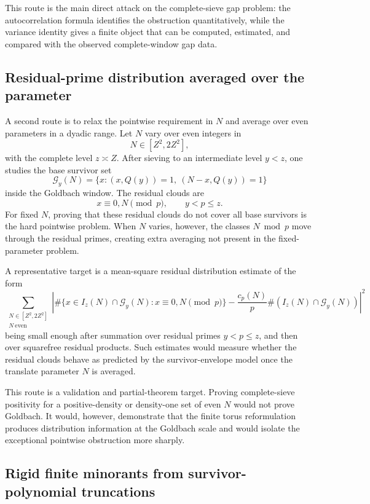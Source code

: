 \documentclass[11pt]{article}
\theoremstyle{plain}
\theoremstyle{definition}
\theoremstyle{remark}
\newcommand{\G}{\mathcal G}
\begin{document}
This route is the main direct attack on the complete-sieve gap problem: the
autocorrelation formula identifies the obstruction quantitatively, while the
variance identity gives a finite object that can be computed, estimated, and
compared with the observed complete-window gap data.

\subsection{Residual-prime distribution averaged over the parameter}

A second route is to relax the pointwise requirement in \(N\) and average over
even parameters in a dyadic range.  Let \(N\) vary over even integers in
\[
N\in[Z^2,2Z^2],
\]
with the complete level \(z\asymp Z\).  After sieving to an intermediate level
\(y<z\), one studies the base survivor set
\[
\G_y(N)=\{x:(x,Q(y))=1,\ (N-x,Q(y))=1\}
\]
inside the Goldbach window.  The residual clouds are
\[
x\equiv 0,N\pmod p,\qquad y<p\le z.
\]
For fixed \(N\), proving that these residual clouds do not cover all base
survivors is the hard pointwise problem.  When \(N\) varies, however, the
classes \(N\bmod p\) move through the residual primes, creating extra averaging
not present in the fixed-parameter problem.

A representative target is a mean-square residual distribution estimate of the
form
\[
\sum_{\substack{N\in[Z^2,2Z^2]\\ N\ \mathrm{even}}}
\left|
\#\{x\in I_z(N)\cap\G_y(N):x\equiv 0,N\pmod p\}
-\frac{c_p(N)}p\#(I_z(N)\cap\G_y(N))
\right|^2
\]
being small enough after summation over residual primes \(y<p\le z\), and then
over squarefree residual products.  Such estimates would measure whether the
residual clouds behave as predicted by the survivor-envelope model once the
translate parameter \(N\) is averaged.

This route is a validation and partial-theorem target.  Proving complete-sieve
positivity for a positive-density or density-one set of even \(N\) would not
prove Goldbach.  It would, however, demonstrate that the finite torus
reformulation produces distribution information at the Goldbach scale and would
isolate the exceptional pointwise obstruction more sharply.

\subsection{Rigid finite minorants from survivor-polynomial truncations}
\end{document}
